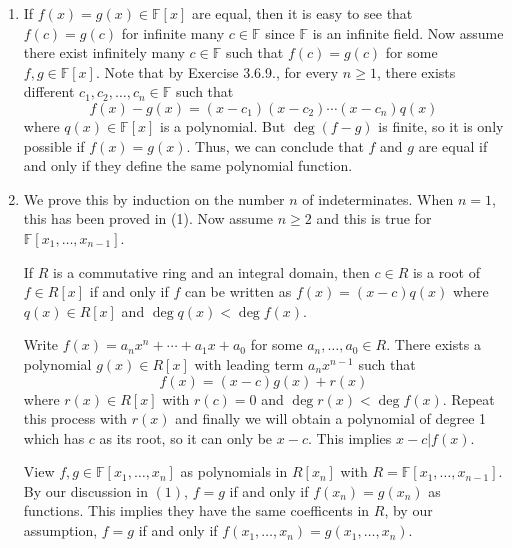 \documentclass[a4paper, 12pt]{article}
\begin{document}
\begin{solution}
\begin{enumerate}[(1)]
\item If \(f(x)=g(x)\in \mathbb{F}[x]\) are equal, then it is easy to see that \(f(c)=g(c)\) for infinite many \(c\in \mathbb{F}\) since \(\mathbb{F}\) is an infinite field. Now assume there exist infinitely many \(c\in \mathbb{F}\) such that \(f(c)=g(c)\) for some 
\(f,g\in \mathbb{F}[x]\). Note that by Exercise 3.6.9., for every \(n\geq 1\), there exists different \(c_1,c_2,\ldots,c_n\in \mathbb{F}\) such that 
\[f(x)-g(x)=(x-c_1)(x-c_2)\cdots(x-c_n)q(x)\]
where \(q(x)\in \mathbb{F}[x]\) is a polynomial. But \(\deg (f-g)\) is finite, so it is only possible if \(f(x)=g(x)\). Thus, we can conclude that \(f\) and \(g\) are equal if and only if they define the same polynomial function.
\item We prove this by induction on the number \(n\) of indeterminates. When \(n=1\), this has been proved in (1). Now assume \(n\geq 2\) and this is true for \(\mathbb{F}[x_1,\ldots,x_{n-1}]\).

\begin{claim}
If \(R\) is a commutative ring and an integral domain, then \(c\in R\) is a root of \(f\in R[x]\) if and only if \(f\) can be written as \(f(x)=(x-c)q(x)\) where \(q(x)\in R[x]\) and \(\deg q(x)<\deg f(x)\).
\end{claim}
\begin{claimproof}
Write \(f(x)=a_nx^n+\cdots+a_1x+a_0\) for some \(a_n,\ldots,a_0\in R\). There exists a polynomial \(g(x)\in R[x]\) with leading term \(a_nx^{n-1}\) such that 
\[f(x)=(x-c)g(x)+r(x)\]
where \(r(x)\in R[x]\) with \(r(c)=0\) and \(\deg r(x)<\deg f(x)\). Repeat this process with \(r(x)\) and finally we will obtain a polynomial of degree 1 which has \(c\) as its root, so it can only be \(x-c\). This implies \(x-c|f(x)\). 
\end{claimproof}

View \(f,g\in \mathbb{F}[x_1,\ldots,x_n]\) as polynomials in \(R[x_n]\) with \(R=\mathbb{F}[x_1,\ldots,x_{n-1}]\). By our discussion in \((1)\), \(f=g\) if and only if \(f(x_n)=g(x_n)\) as functions. This implies they have the same coefficents in \(R\), by our assumption, 
\(f=g\) if and only if \(f(x_1,\ldots,x_n)=g(x_1,\ldots,x_n)\).
\end{enumerate}
\end{solution}
\end{document}
